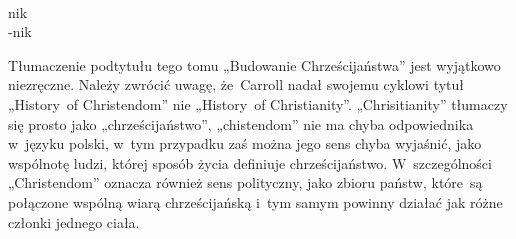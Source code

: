\documentclass[a4paper,11pt]{article}
\begin{document}
\begin{center}
\begin{tabular}{|c|c|c|c|c|}
    \hline
  \end{tabular}

\end{center}

\vspace{\spaceTwo}


\noindent
{} \\
\Jest \hspace{5pt} nik \\
\Powin -nik \\











\newpage


\vspace{0em}



\vspace{0em}


\noindent
Tłumaczenie podtytułu tego tomu „Budowanie Chrześcijaństwa” jest wyjątkowo
niezręczne. Należy zwrócić uwagę, że~Carroll nadał swojemu cyklowi tytuł
„History~of Christendom” nie „History~of Christianity”. „Chrisitianity”
tłumaczy się prosto jako „chrześcijaństwo”, „chistendom” nie ma chyba
odpowiednika w~języku polski, w~tym przypadku zaś można jego sens chyba
wyjaśnić, jako wspólnotę ludzi, której sposób życia definiuje
chrześcijaństwo. W~szczególności „Christendom” oznacza również sens
polityczny, jako zbioru państw, które~są połączone wspólną wiarą
chrześcijańską i~tym samym powinny działać jak różne członki jednego ciała.
\end{document}
